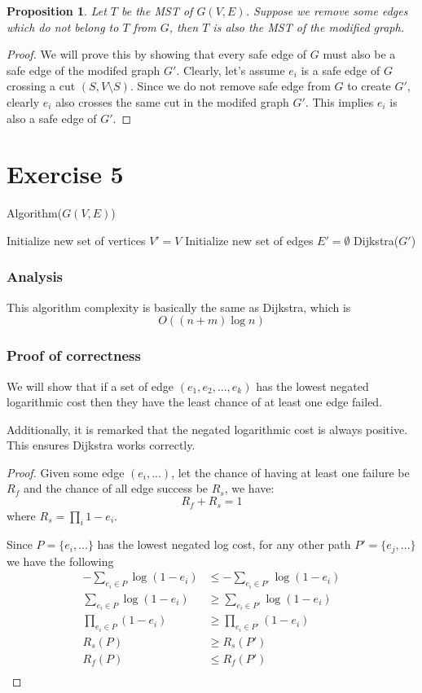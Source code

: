 \documentclass[a4paper,10pt,twoside]{article}
\newtheorem{proof}{Proof}
\newtheorem{proposition}{Proposition}
\begin{document}
\begin{proposition}
	Let $T$ be the MST of $G(V, E)$. Suppose we remove some edges which do not belong
	to $T$ from $G$, then $T$ is also the MST of the modified graph.
\end{proposition}
\begin{proof}
	We will prove this by showing that every safe edge of $G$ must also be a safe edge
	of the modifed graph $G'$. Clearly, let's assume $e_i$ is a safe edge of $G$ crossing a cut
	$(S, V\setminus S)$. Since we do not remove safe edge from $G$ to create $G'$, clearly
	$e_i$ also crosses the same cut in the modifed graph $G'$. This implies $e_i$ is also
	a safe edge of $G'$.
\end{proof}


\section*{Exercise 5}
\begin{algorithm}[H]
	\caption{Algorithm($G(V, E)$)}
	Initialize new set of vertices $V' = V$\;
	Initialize new set of edges $E' = \emptyset$\; 
	\Return Dijkstra($G'$)
\end{algorithm}

\subsubsection*{Analysis}
This algorithm complexity is basically the same as Dijkstra, which is 
$$O((n + m)\log n)$$

\subsubsection*{Proof of correctness}
We will show that if a set of edge $(e_1, e_2, ..., e_k)$ has the lowest
negated logarithmic cost then they have the least chance of at least
one edge failed.

Additionally, it is remarked that the negated logarithmic cost is always
positive. This ensures Dijkstra works correctly.

\begin{proof}
	Given some edge $(e_i,...)$, let the chance of having at least one failure
	be $R_f$ and the chance of all edge success be $R_s$, we have:
	\[
	 	R_f + R_s = 1
	 \] 
	 where $R_s = \prod_i{1-e_i}$.

	 Since $P = \{e_i,...\}$ has the lowest negated log cost, for any 
	 other path $P' = \{e_j,...\}$
	 we have the following
	 \[
	 	\begin{aligned}
	 		- \sum_{e_i \in P}{\log{(1 - e_i)}} &\leq - \sum_{e_i \in P'}{\log{(1 - e_i)}} \\
	 		\sum_{e_i \in P}{\log{(1 - e_i)}} &\geq \sum_{e_i \in P'}{\log{(1 - e_i)}} \\
	 		\prod_{e_i \in P}{(1 - e_i)} &\geq \prod_{e_i \in P'}{(1 - e_i)} \\
	 		R_s(P) & \geq R_s(P') \\
	 		R_f(P) & \leq R_f(P') \\
	 	\end{aligned}
	 \]
\end{proof}
\end{document}
